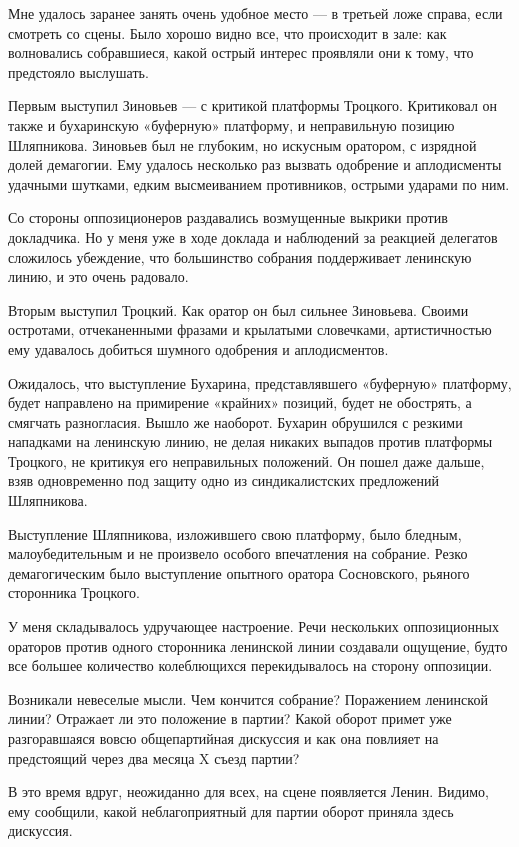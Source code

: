 \documentclass[12pt, a4paper, openany]{book}
\begin{document}
Мне удалось заранее занять очень удобное место — в третьей ложе справа, если смотреть со сцены. Было хорошо видно все, что происходит в зале: как волновались собравшиеся, какой острый интерес проявляли они к тому, что предстояло выслушать.

Первым выступил Зиновьев — с критикой платформы Троцкого. Критиковал он также и бухаринскую «буферную» платформу, и неправильную позицию Шляпникова. Зиновьев был не глубоким, но искусным оратором, с изрядной долей демагогии. Ему удалось несколько раз вызвать одобрение и аплодисменты удачными шутками, едким высмеиванием противников, острыми ударами по ним.

Со стороны оппозиционеров раздавались возмущенные выкрики против докладчика. Но у меня уже в ходе доклада и наблюдений за реакцией делегатов сложилось убеждение, что большинство собрания поддерживает ленинскую линию, и это очень радовало.

Вторым выступил Троцкий. Как оратор он был сильнее Зиновьева. Своими остротами, отчеканенными фразами и крылатыми словечками, артистичностью ему удавалось добиться шумного одобрения и аплодисментов.

Ожидалось, что выступление Бухарина, представлявшего «буферную» платформу, будет направлено на примирение «крайних» позиций, будет не обострять, а смягчать разногласия. Вышло же наоборот. Бухарин обрушился с резкими нападками на ленинскую линию, не делая никаких выпадов против платформы Троцкого, не критикуя его неправильных положений. Он пошел даже дальше, взяв одновременно под защиту одно из синдикалистских предложений Шляпникова.

Выступление Шляпникова, изложившего свою платформу, было бледным, малоубедительным и не произвело особого впечатления на собрание. Резко демагогическим было выступление опытного оратора Сосновского, рьяного сторонника Троцкого.

У меня складывалось удручающее настроение. Речи нескольких оппозиционных ораторов против одного сторонника ленинской линии создавали ощущение, будто все большее количество колеблющихся перекидывалось на сторону оппозиции.

Возникали невеселые мысли. Чем кончится собрание? Поражением ленинской линии? Отражает ли это положение в партии? Какой оборот примет уже разгоравшаяся вовсю общепартийная дискуссия и как она повлияет на предстоящий через два месяца X съезд партии?

В это время вдруг, неожиданно для всех, на сцене появляется Ленин. Видимо, ему сообщили, какой неблагоприятный для партии оборот приняла здесь дискуссия.
\end{document}
